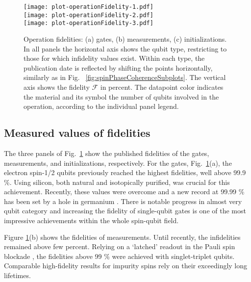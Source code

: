 \documentclass[aps, prx, showpacs, twocolumn, superscriptaddress, notitlepage, longbibliography, floatfix, nofootinbib]{revtex4-2}
\newcommand{\recheck}[1]{{#1}}
\begin{document}
\begin{figure}[ht!]
  \texttt{[image: plot-operationFidelity-1.pdf]} \hfill\\
  \texttt{[image: plot-operationFidelity-2.pdf]} \hfill\\
  \texttt{[image: plot-operationFidelity-3.pdf]} \hfill\\
  \caption{
    \label{fig:operationInfidelities}
  Operation fidelities: (a) gates, (b) measurements, (c) initializations. In all panels the horizontal axis shows the qubit type, restricting to those for which infidelity values exist. Within each type, the publication date is reflected by shifting the points horizontally, similarly as in Fig. ~\ref{fig:spinPhaseCoherenceSubplots}. The vertical axis shows the fidelity $\mathcal{F}$ in percent. The datapoint color indicates the material and its symbol the number of qubits involved in the operation, according to the individual panel legend.
  }
\end{figure}

\subsection{Measured values of fidelities}

The three panels of Fig.~\ref{fig:operationInfidelities} show the published fidelities of the gates, measurements, and initializations, respectively. For the gates, Fig.~\ref{fig:operationInfidelities}(a), \recheck{the electron spin-1/2 qubits previously reached the highest fidelities, well above 99.9 \%. Using silicon, both natural and isotopically purified, was crucial for this achievement. Recently, these values were overcome and a new record at 99.99 \% has been set by a hole in germanium \cite{lawrie_simultaneous_2021}.} \recheck{There is notable progress in almost very qubit category} and increasing the fidelity of single-qubit gates is one of the most impressive achievements within the whole spin-qubit field. 

Figure \ref{fig:operationInfidelities}(b) shows the fidelities of measurements. \recheck{Until recently, the infidelities remained above few percent.} \recheck{Relying on a `latched' readout in the Pauli spin blockade \cite{nakajima_robust_2017,broome_high-fidelity_2017}, the fidelities above 99 \% were achieved with singlet-triplet qubits. Comparable high-fidelity results for impurity spins rely on their exceedingly long lifetimes.}
\end{document}
